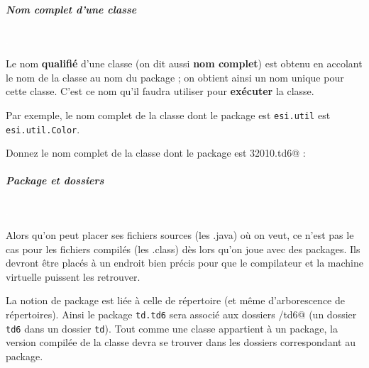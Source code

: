 \documentclass[11pt,a4paper]{article}
\begin{document}
		\subparagraph{Nom complet d'une classe} 
		
					\textcolor{white}{.} \par
				
            \par
        
				Le nom 
				\textbf{qualifi\'e} 
				d'une classe 
				(on dit aussi \textbf{nom complet})
				est obtenu en accolant
				le nom de la classe au nom du package ;
				on obtient ainsi un nom unique pour cette classe.
				C'est ce nom qu'il faudra utiliser pour 
				\textbf{ex\'ecuter} la classe.
			
            \par
        
				Par exemple, le nom complet de la classe \verb@Color@ 
				dont le package est \verb|esi.util|
				est \verb|esi.util.Color|. 
			
            \par
        
						Donnez le nom complet de la classe \verb@SurfaceTriangle@
						dont le package est \verb@g32010.td6@ :
					 \textcolor{gray}{\underline{\hspace*{16em}}} 
			
		\subparagraph{Package et dossiers} 
		
					\textcolor{white}{.} \par
				
            \par
        
				Alors qu'on peut placer ses fichiers sources (les .java)
				o\`u on veut, ce n'est pas le cas pour les fichiers
				compil\'es (les .class) d\`es lors qu'on joue avec des packages.
				Ils devront \^etre plac\'es \`a un endroit bien pr\'ecis
				pour que le compilateur et la machine virtuelle
				puissent les retrouver.
			
            \par
        			
				La notion de package est li\'ee \`a celle de r\'epertoire
				(et m\^eme d'arborescence de r\'epertoires).
				Ainsi le package
				\verb|td.td6| sera associ\'e 
				aux dossiers \verb@td/td6@
				(un dossier \verb|td6| 
				dans un dossier \verb|td|).
				Tout comme une classe appartient \`a un package,
				la version compil\'ee de la classe
				devra se trouver dans les dossiers correspondant au package.
			
            \par
        
\end{document}
